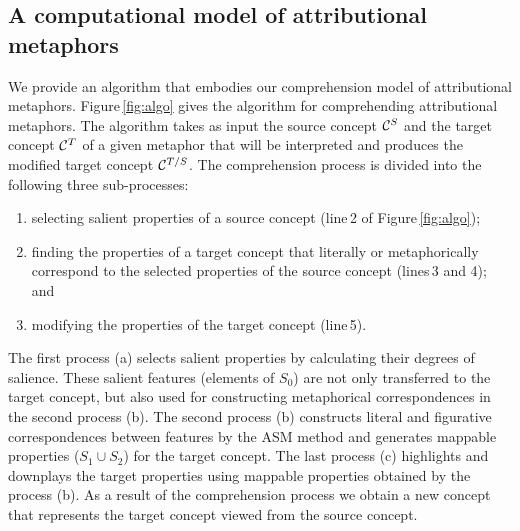 \subsection{A computational model of attributional metaphors} \label{subsec:metaphor-model}
We provide an algorithm that embodies our comprehension model of attributional metaphors. 
Figure\,\ref{fig:algo} gives the algorithm for comprehending attributional
metaphors. 
The algorithm takes as input the source concept ${\cal C}^S$ and the target concept
${\cal C}^T$ of a given metaphor that will be interpreted
and produces the modified target concept ${\cal C}^{T/S}$.
The comprehension process is divided into the following three sub-processes:
\begin{enumerate}
  \renewcommand{\theenumi}{}
  \renewcommand{\labelenumi}{}
\item selecting salient properties of a source concept (line\,2 of Figure\,\ref{fig:algo});
\item finding the properties of a target concept that literally or
  metaphorically correspond to the selected properties of the source concept
  (lines\,3 and 4); and
\item modifying the properties of the target concept (line\,5).
\end{enumerate}
The first process (a) selects salient properties by calculating their
degrees of salience. These salient features (elements of $S_0$)
are not only transferred to the target concept, 
but also used for constructing metaphorical 
correspondences in the second process (b).
The second process (b) constructs literal and figurative correspondences 
between features by the ASM method and generates mappable properties ($S_1 \cup S_2$)
for the target concept.
The last process (c) highlights and downplays the target properties 
using mappable properties obtained by the process (b). 
As a result of the comprehension process
we obtain a new concept that represents the target concept viewed from the source concept.


